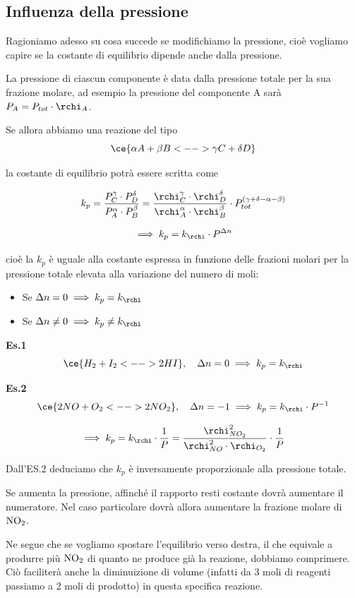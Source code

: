 
\subsection{Influenza della pressione}
Ragioniamo adesso su cosa succede se modifichiamo la pressione, cioè vogliamo capire se la costante di equilibrio dipende anche dalla pressione.

La pressione di ciascun componente è data dalla pressione totale per la sua frazione molare, ad esempio la pressione del componente A sarà $P_A = P_{tot} \cdot \rchi_A$.

Se allora abbiamo una reazione del tipo
$$\ce{\alpha A + \beta B <--> \gamma C + \delta D}$$

la costante di equilibrio potrà essere scritta come

$$k_p = \frac{P_C^{\gamma} \cdot P_D^{\delta}}{P_A^{\alpha} \cdot P_B^{\beta}} = \frac{\rchi_C^{\gamma} \cdot \rchi_D^{\delta}}{\rchi_A^{\alpha} \cdot \rchi_B^{\beta}} \cdot P_{tot}^{(\gamma + \delta - \alpha - \beta)}$$

$$\implies k_p = k_{\rchi} \cdot P^{\Delta n}$$

cioè la $k_p$ è uguale alla costante espressa in funzione delle frazioni molari per la pressione totale elevata alla variazione del numero di moli:

\begin{itemize}
    \item Se $\Delta n = 0 \implies k_p = k_{\rchi}$
    \item Se $\Delta n \neq 0 \implies k_p \neq k_{\rchi}$
\end{itemize}

\vspace{0.2cm}\textbf{Es.1}
$$\ce{H_2 + I_2 <--> 2HI}, \quad \Delta n = 0 \implies k_p = k_{\rchi}$$

\textbf{Es.2}
$$\ce{2NO + O_2 <--> 2NO_2}, \quad \Delta n = -1 \implies k_p = k_{\rchi} \cdot P^{-1}$$

$$\implies k_p = k_{\rchi} \cdot \frac{1}{P}= \frac{\rchi_{NO_2}^2}{\rchi_{NO}^2 \cdot \rchi_{O_2}} \cdot \frac{1}{P}$$

Dall'ES.2 deduciamo che $k_p$ è inversamente proporzionale alla pressione totale.

Se aumenta la pressione, affinché il rapporto resti costante dovrà aumentare il numeratore. Nel caso particolare dovrà allora aumentare la frazione molare di $\rm NO_2$.

Ne segue che se vogliamo spostare l'equilibrio verso destra, il che equivale a produrre più $\rm NO_2$ di quanto ne produce già la reazione, dobbiamo comprimere. Ciò faciliterà anche la diminuizione di volume (infatti da 3 moli di reagenti passiamo a 2 moli di prodotto) in questa specifica reazione.

